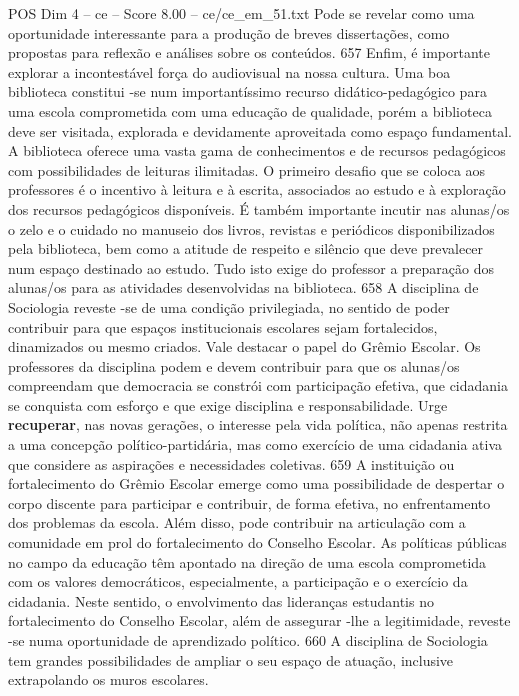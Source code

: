 \begin{textsample}{POS Dim 4 – ce – Score 8.00 – ce/ce\_em\_51.txt}
Pode se revelar como uma oportunidade interessante para a produção de breves dissertações, como propostas para reflexão e análises sobre os conteúdos. 657 Enfim, é importante explorar a incontestável força do audiovisual na nossa cultura.
Uma boa biblioteca constitui -se num importantíssimo recurso didático-pedagógico para uma escola comprometida com uma educação de qualidade, porém a biblioteca deve ser visitada, explorada e devidamente aproveitada como espaço fundamental.
A biblioteca oferece uma vasta gama de conhecimentos e de recursos pedagógicos com possibilidades de leituras ilimitadas.
O primeiro desafio que se coloca aos professores é o incentivo à leitura e à escrita, associados ao estudo e à exploração dos recursos pedagógicos disponíveis.
É também importante incutir nas alunas/os o zelo e o cuidado no manuseio dos livros, revistas e periódicos disponibilizados pela biblioteca, bem como a atitude de respeito e silêncio que deve prevalecer num espaço destinado ao estudo.
Tudo isto exige do professor a preparação dos alunas/os para as atividades desenvolvidas na biblioteca. 658 A disciplina de Sociologia reveste -se de uma condição privilegiada, no sentido de poder contribuir para que espaços institucionais escolares sejam fortalecidos, dinamizados ou mesmo criados.
Vale destacar o papel do Grêmio Escolar.
Os professores da disciplina podem e devem contribuir para que os alunas/os compreendam que democracia se constrói com participação efetiva, que cidadania se conquista com esforço e que exige disciplina e responsabilidade.
Urge \textbf{recuperar}, nas novas gerações, o interesse pela vida política, não apenas restrita a uma concepção político-partidária, mas como exercício de uma cidadania ativa que considere as aspirações e necessidades coletivas. 659 A instituição ou fortalecimento do Grêmio Escolar emerge como uma possibilidade de despertar o corpo discente para participar e contribuir, de forma efetiva, no enfrentamento dos problemas da escola.
Além disso, pode contribuir na articulação com a comunidade em prol do fortalecimento do Conselho Escolar.
As políticas públicas no campo da educação têm apontado na direção de uma escola comprometida com os valores democráticos, especialmente, a participação e o exercício da cidadania.
Neste sentido, o envolvimento das lideranças estudantis no fortalecimento do Conselho Escolar, além de assegurar -lhe a legitimidade, reveste -se numa oportunidade de aprendizado político. 660 A disciplina de Sociologia tem grandes possibilidades de ampliar o seu espaço de atuação, inclusive extrapolando os muros escolares.

\end{textsample}
